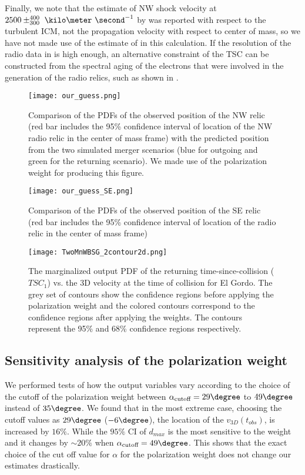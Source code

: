\par 
Finally, we note that the estimate of NW shock velocity at $2500
\pm^{400}_{300}~\kilo\meter~\second^{-1}$ by \cite{L13} was reported with respect to
the turbulent ICM, not the propagation velocity with respect to center of
mass, so we have not made use of the estimate of \cite{L13} in this
calculation. If the resolution of the radio data in \cite{L13} is high
enough, an alternative constraint of the TSC can be constructed from
the spectral aging of the electrons that were involved in the generation of the
radio relics, such as shown in \citet{Stroe14}. \par
\begin{figure}
	\texttt{[image: our\_guess.png]}
	\caption{Comparison of the PDFs of the observed position of the NW relic (red bar
		includes the 95\% confidence interval of location of the NW radio relic in the center of mass frame) with the predicted position from the two simulated merger
		scenarios (blue for outgoing and green for the returning scenario).
	We made use of the polarization weight for producing this figure.} 
	\label{fig:our_guessed_scenario}
\end{figure}
\begin{figure}
	\texttt{[image: our\_guess\_SE.png]}
	\caption{Comparison of the PDFs of the observed position of the SE relic (red bar
	includes the 95\% confidence interval of location of the radio relic in
the center of mass frame)}
\end{figure}
\begin{figure}
	\texttt{[image: TwoMnWBSG\_2contour2d.png]}
	\caption{The marginalized output PDF of the returning time-since-collision
($TSC_1$) vs. the 3D velocity at the time of collision for El Gordo. The
grey set of contours show the confidence regions before applying the
polarization weight and the colored contours correspond to the confidence
regions after applying the weights. The contours represent the 95\% and
68\% confidence regions respectively. }
	\label{fig:TSC_v3D}
\end{figure}
\subsection{Sensitivity analysis of the polarization weight}
%
\label{sec:sensitivityTests}
We performed tests of how the output variables vary according to the
choice of the cutoff of the polarization weight between
$\alpha_{\text{cutoff}} =
29 \degree$ to $49\degree$ instead of $35 \degree$.  
We found that in the most extreme case, choosing the cutoff values as $29
\degree$ ($-6 \degree$), the location of the $v_{3D}(t_{obs})$, is
increased by $ 16 \%$. While the $95\%$ CI of $d_{max}$ is
the most sensitive to the weight and it changes by
$\sim20 \%$ when $\alpha_{\text{cutoff}} = 49 \degree$. 
This shows that the exact choice of the cut off value for $\alpha$ for the
polarization weight does not change our estimates drastically.


